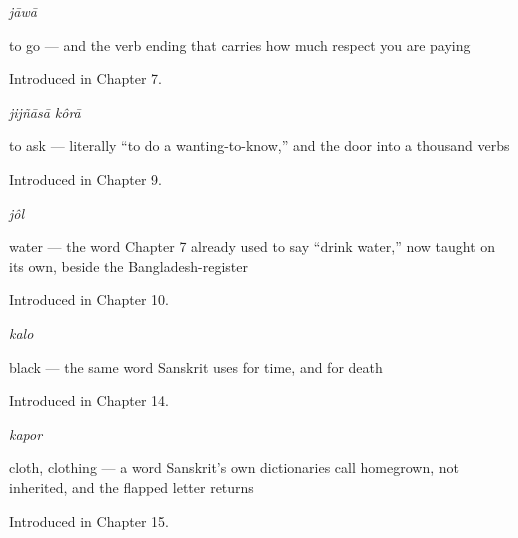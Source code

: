 \noindent\begin{minipage}[t]{\linewidth}
\raggedright
\textbf{}\enspace\emph{jāwā}\par
\small to go — and the verb ending that carries how much respect you are paying\par
\footnotesize Introduced in Chapter 7.
\end{minipage}\par\medskip

\noindent\begin{minipage}[t]{\linewidth}
\raggedright
\textbf{ }\enspace\emph{jijñāsā kôrā}\par
\small to ask — literally \textquotedblleft{}to do a wanting-to-know,\textquotedblright{} and the door into a thousand verbs\par
\footnotesize Introduced in Chapter 9.
\end{minipage}\par\medskip

\noindent\begin{minipage}[t]{\linewidth}
\raggedright
\textbf{}\enspace\emph{jôl}\par
\small water — the word Chapter 7 already used to say \textquotedblleft{}drink water,\textquotedblright{} now taught on its own, beside the Bangladesh-register \par
\footnotesize Introduced in Chapter 10.
\end{minipage}\par\medskip

\noindent\begin{minipage}[t]{\linewidth}
\raggedright
\textbf{}\enspace\emph{kalo}\par
\small black — the same word Sanskrit uses for time, and for death\par
\footnotesize Introduced in Chapter 14.
\end{minipage}\par\medskip

\noindent\begin{minipage}[t]{\linewidth}
\raggedright
\textbf{}\enspace\emph{kapor}\par
\small cloth, clothing — a word Sanskrit's own dictionaries call homegrown, not inherited, and the flapped letter returns\par
\footnotesize Introduced in Chapter 15.
\end{minipage}\par\medskip

